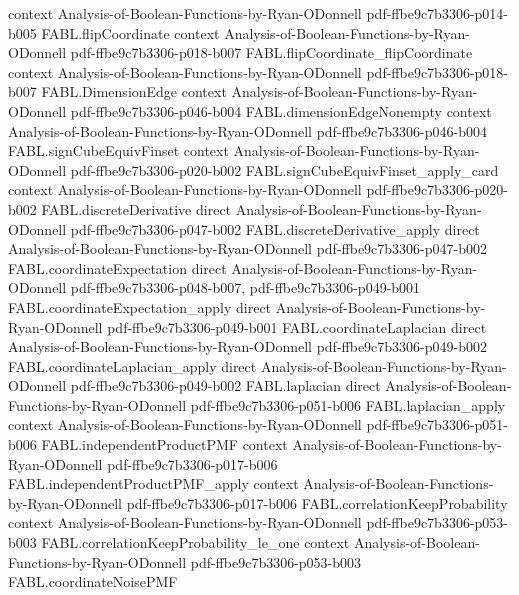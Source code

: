 \begin{theorem}
  {context}
  {Analysis-of-Boolean-Functions-by-Ryan-ODonnell}
  {pdf-ffbe9c7b3306-p014-b005}
\proofstep
  {FABL.flipCoordinate}
  {context}
  {Analysis-of-Boolean-Functions-by-Ryan-ODonnell}
  {pdf-ffbe9c7b3306-p018-b007}
\proofstep
  {FABL.flipCoordinate_flipCoordinate}
  {context}
  {Analysis-of-Boolean-Functions-by-Ryan-ODonnell}
  {pdf-ffbe9c7b3306-p018-b007}
\proofstep
  {FABL.DimensionEdge}
  {context}
  {Analysis-of-Boolean-Functions-by-Ryan-ODonnell}
  {pdf-ffbe9c7b3306-p046-b004}
\proofstep
  {FABL.dimensionEdgeNonempty}
  {context}
  {Analysis-of-Boolean-Functions-by-Ryan-ODonnell}
  {pdf-ffbe9c7b3306-p046-b004}
\proofstep
  {FABL.signCubeEquivFinset}
  {context}
  {Analysis-of-Boolean-Functions-by-Ryan-ODonnell}
  {pdf-ffbe9c7b3306-p020-b002}
\proofstep
  {FABL.signCubeEquivFinset_apply_card}
  {context}
  {Analysis-of-Boolean-Functions-by-Ryan-ODonnell}
  {pdf-ffbe9c7b3306-p020-b002}
\proofstep
  {FABL.discreteDerivative}
  {direct}
  {Analysis-of-Boolean-Functions-by-Ryan-ODonnell}
  {pdf-ffbe9c7b3306-p047-b002}
\proofstep
  {FABL.discreteDerivative_apply}
  {direct}
  {Analysis-of-Boolean-Functions-by-Ryan-ODonnell}
  {pdf-ffbe9c7b3306-p047-b002}
\proofstep
  {FABL.coordinateExpectation}
  {direct}
  {Analysis-of-Boolean-Functions-by-Ryan-ODonnell}
  {pdf-ffbe9c7b3306-p048-b007,
    pdf-ffbe9c7b3306-p049-b001}
\proofstep
  {FABL.coordinateExpectation_apply}
  {direct}
  {Analysis-of-Boolean-Functions-by-Ryan-ODonnell}
  {pdf-ffbe9c7b3306-p049-b001}
\proofstep
  {FABL.coordinateLaplacian}
  {direct}
  {Analysis-of-Boolean-Functions-by-Ryan-ODonnell}
  {pdf-ffbe9c7b3306-p049-b002}
\proofstep
  {FABL.coordinateLaplacian_apply}
  {direct}
  {Analysis-of-Boolean-Functions-by-Ryan-ODonnell}
  {pdf-ffbe9c7b3306-p049-b002}
\proofstep
  {FABL.laplacian}
  {direct}
  {Analysis-of-Boolean-Functions-by-Ryan-ODonnell}
  {pdf-ffbe9c7b3306-p051-b006}
\proofstep
  {FABL.laplacian_apply}
  {context}
  {Analysis-of-Boolean-Functions-by-Ryan-ODonnell}
  {pdf-ffbe9c7b3306-p051-b006}
\proofstep
  {FABL.independentProductPMF}
  {context}
  {Analysis-of-Boolean-Functions-by-Ryan-ODonnell}
  {pdf-ffbe9c7b3306-p017-b006}
\proofstep
  {FABL.independentProductPMF_apply}
  {context}
  {Analysis-of-Boolean-Functions-by-Ryan-ODonnell}
  {pdf-ffbe9c7b3306-p017-b006}
\proofstep
  {FABL.correlationKeepProbability}
  {context}
  {Analysis-of-Boolean-Functions-by-Ryan-ODonnell}
  {pdf-ffbe9c7b3306-p053-b003}
\proofstep
  {FABL.correlationKeepProbability_le_one}
  {context}
  {Analysis-of-Boolean-Functions-by-Ryan-ODonnell}
  {pdf-ffbe9c7b3306-p053-b003}
\proofstep
  {FABL.coordinateNoisePMF}

\end{theorem}
